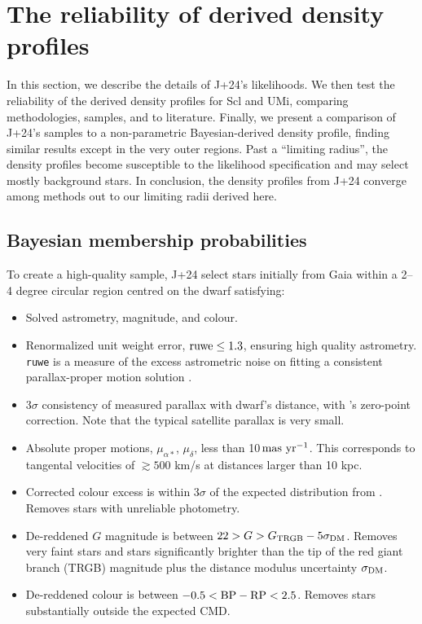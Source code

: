 \chapter{The reliability of derived density
profiles}\label{sec:extra_density}

In this section, we describe the details of J+24's likelihoods. We then
test the reliability of the derived density profiles for Scl and UMi,
comparing methodologies, samples, and to literature. Finally, we present
a comparison of J+24's samples to a non-parametric Bayesian-derived
density profile, finding similar results except in the very outer
regions. Past a ``limiting radius'', the density profiles become
susceptible to the likelihood specification and may select mostly
background stars. In conclusion, the density profiles from J+24 converge
among methods out to our limiting radii derived here.

\section{Bayesian membership
probabilities}\label{bayesian-membership-probabilities}

To create a high-quality sample, J+24 select stars initially from Gaia
within a 2--4 degree circular region centred on the dwarf satisfying:

\begin{itemize}
\tightlist
\item
  Solved astrometry, magnitude, and colour.
\item
  Renormalized unit weight error, \({\rm ruwe} \leq 1.3\), ensuring high
  quality astrometry. \texttt{ruwe} is a measure of the excess
  astrometric noise on fitting a consistent parallax-proper motion
  solution \citep[see][]{lindegren+2021}.\\
\item
  3\(\sigma\) consistency of measured parallax with dwarf's distance,
  with \citet{lindegren+2021}'s zero-point correction. Note that the
  typical satellite parallax is very small.
\item
  Absolute proper motions, \(\mu_{\alpha*}\), \(\mu_\delta\), less than
  10\(\,{\rm mas\ yr^{-1}}\). This corresponds to tangental velocities
  of \(\gtrsim 500\) km/s at distances larger than 10 kpc.
\item
  Corrected colour excess is within 3\(\sigma\) of the expected
  distribution from \citet{riello+2021}. Removes stars with unreliable
  photometry.
\item
  De-reddened \(G\) magnitude is between
  \(22 > G > G_{\rm TRGB} - 5\sigma_{\rm DM}\). Removes very faint stars
  and stars significantly brighter than the tip of the red giant branch
  (TRGB) magnitude plus the distance modulus uncertainty
  \(\sigma_{\rm DM}\).
\item
  De-reddened colour is between \(-0.5 < {\rm BP - RP} <  2.5\). Removes
  stars substantially outside the expected CMD.
\end{itemize}

